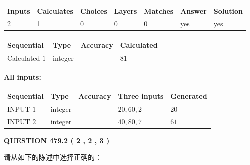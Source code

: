 \documentclass{ctexart}
\begin{document}
 
\noindent{}
 
 

 
   
   
   
   
\noindent\begin{tabular}{|l|l|l|l|l|l|l|}
 \hline
Inputs & Calculates & Choices & Layers & Matches & Answer & Solution \\ \hline
 2  & 
 1  & 
 0
  & 
 0  & 
 0  & 
  yes & 
  yes 
  \\ \hline
 \end{tabular}
   
   
   
   
\noindent{}
   
   
  
  
\noindent\begin{tabular}{|l|l|l|l|}
\hline
 Sequential & Type & Accuracy & Calculated \\ 
\hline
 
 
  Calculated $  1 $ & integer &  & 
  $ 81 $ 
 \\  \hline  
 \end{tabular}
   
   
   
   
\noindent\vspace{0.1in}\hspace{-0.08in} {\textbf{\Large{All inputs: }}}
   
   
  
  
\noindent\begin{tabular}{|l|l|l|l|l|}
\hline
 Sequential & Type & Accuracy & Three inputs & Generated \\ 
\hline
 
 
  INPUT $  1 $ & integer &  & $
 20
 , 
 60
 , 
 2
 $ & $ 20 $ 
 \\  \hline  
 
 
  INPUT $  2 $ & integer &  & $
 40
 , 
 80
 , 
 7
 $ & $ 61 $ 
 \\  \hline  
 \end{tabular}
   
   
  
\vspace{0.2in}
  
{\textbf{\Large{QUESTION
479.2 
 ( 2 , 2 , 3 )
}}}
  
  
请从如下的陈述中选择正确的：
 
\end{document}
